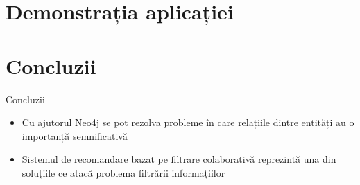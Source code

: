 \documentclass{beamer}
\begin{document}
\section{Demonstrația aplicației}
\frame{\tableofcontents[currentsection]}

\section{Concluzii}
\frame{\tableofcontents[currentsection]}
\begin{frame}{Concluzii}
	\begin{itemize}
	    \item Cu ajutorul Neo4j se pot rezolva probleme în care relațiile dintre entități au o importanță semnificativă
	    \item Sistemul de recomandare bazat pe filtrare colaborativă reprezintă una din soluțiile ce atacă problema filtrării informațiilor
	\end{itemize}
\end{frame}
\end{document}
